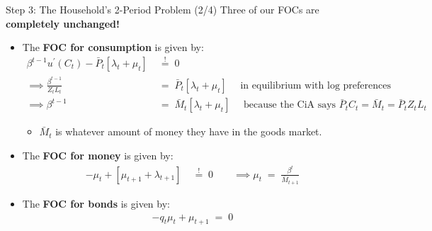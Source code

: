 \documentclass[10pt,c,aspectratio=1610,handout]{beamer}
\begin{document}
\begin{frame}{Step 3: The Household's 2-Period Problem (2/4)}%
  Three of our FOCs are \textbf{completely unchanged!}%
  \pause%
  \begin{itemize}%
    \item[$\blacktriangleright$] The \textbf{FOC for consumption} is given by:%
    \begin{align*}%
      \beta^{t-1} u^{\prime}(C_t) - \bar{P}_t [ \lambda_t + \mu_t ] \; & \overset{!}{=} \; 0 \\%
      \implies  \frac{\beta^{t-1}} {Z_t L_t} \; & = \; \bar{P}_t [ \lambda_t + \mu_t ] \quad \text{ in equilibrium with log preferences} \\%
      \implies  \beta^{t-1} \; & = \; \bar{M}_t [ \lambda_t + \mu_t ] \quad \text{ because the CiA says } \bar{P}_t C_t = \bar{M}_t = \bar{P}_t Z_t L_t%
    \end{align*}%
    \vspace*{-0.2in}%
    \begin{itemize}%
      \item[$\rightarrow$] $\bar{M}_t$ is whatever amount of money they have in the goods market.%
    \end{itemize}%
    \vspace*{0.1in}%
    \pause%
    \item[$\blacktriangleright$] The \textbf{FOC for money} is given by:%
    \begin{align*}%
      -\mu_t + [ \mu_{t+1} + \lambda_{t+1} ] \; & \overset{!}{=} \; 0 \quad \quad \implies \mu_t \; = \; \frac{\beta^t}{\bar{M}_{t+1}}%
    \end{align*}%
    \pause%
    \item[$\blacktriangleright$] The \textbf{FOC for bonds} is given by:%
    \begin{align*}%
      -q_t \mu_t + \mu_{t+1} \; = \; 0%
    \end{align*}%
  \end{itemize}%
\end{frame}%
\end{document}

